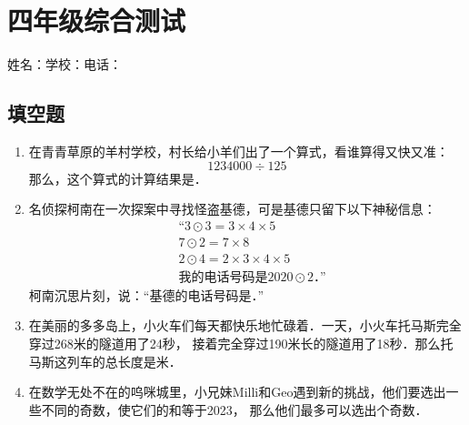 \documentclass{ctexart}
\newcommand{\tk}{\underline{\hspace{2cm}}}
\begin{document}
    \section{四年级综合测试}
    \begin{center}
        \kaishu 姓名：\underline{\hspace{3cm}}\quad 学校：\underline{\hspace{3cm}}\quad 电话：\underline{\hspace{3cm}}\\
    \end{center}
    \subsection{填空题}
    \begin{enumerate}
        \item 在青青草原的羊村学校，村长给小羊们出了一个算式，看谁算得又快又准：
            \[1234000\div 125\]那么，这个算式的计算结果是\tk．\\
        \item 名侦探柯南在一次探案中寻找怪盗基德，可是基德只留下以下神秘信息：\\
            \begin{equation*}
                \begin{aligned}
                   &\text{“} 3\odot 3=3\times 4\times 5 \\
                    &7\odot 2=7\times 8 \\
                    &2\odot 4=2\times 3\times 4\times 5 \\
                    &\text{我的电话号码是}2020\odot 2\text{．”} 
                \end{aligned}
            \end{equation*}
            柯南沉思片刻，说：“基德的电话号码是\tk．”
        \item   在美丽的多多岛上，小火车们每天都快乐地忙碌着．一天，小火车托马斯完全穿过268米的隧道用了24秒，
                接着完全穿过190米长的隧道用了18秒．那么托马斯这列车的总长度是\tk 米．
        \item   在数学无处不在的呜咪城里，小兄妹Milli和Geo遇到新的挑战，他们要选出一些不同的奇数，使它们的和等于2023，
                那么他们最多可以选出\tk 个奇数．
        \end{enumerate}                   
\end{document}
